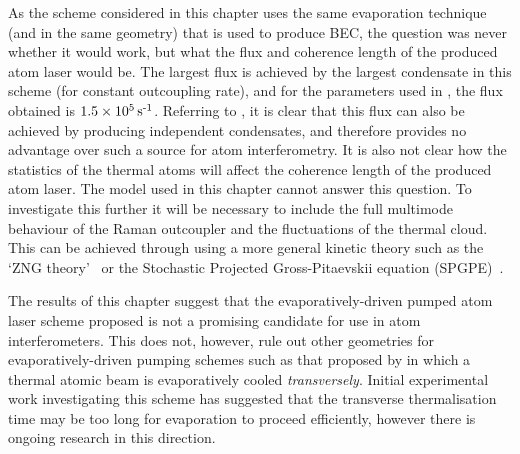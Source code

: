 As the scheme considered in this chapter uses the same evaporation technique (and in the same geometry) that is used to produce BEC, the question was never whether it would work, but what the flux and coherence length of the produced atom laser would be. The largest flux is achieved by the largest condensate in this scheme (for constant outcoupling rate), and for the parameters used in , the flux obtained is $1.5\times \unit[10^5]{s\textsuperscript{-1}}$.  Referring to , it is clear that this flux can also be achieved by producing independent condensates, and therefore provides no advantage over such a source for atom interferometry.  It is also not clear how the statistics of the thermal atoms will affect the coherence length of the produced atom laser.  The model used in this chapter cannot answer this question.  To investigate this further it will be necessary to include the full multimode behaviour of the Raman outcoupler and the fluctuations of the thermal cloud.  This can be achieved through using a more general kinetic theory such as the `ZNG theory'~\citep{Zaremba:1999,Proukakis:2008} or the Stochastic Projected Gross-Pitaevskii equation (SPGPE)~\citep{Blakie:2008a}.

The results of this chapter suggest that the evaporatively-driven pumped atom laser scheme proposed is not a promising candidate for use in atom interferometers.  This does not, however, rule out other geometries for evaporatively-driven pumping schemes such as that proposed by \citet{Mandonnet:2000lr} in which a thermal atomic beam is evaporatively cooled \emph{transversely}.  Initial experimental work investigating this scheme \citep{Cren:2002rt,Roos:2003vn,Roos:2003,Lahaye:2004,Vogels:2004,Lahaye:2005uq} has suggested that the transverse thermalisation time may be too long for evaporation to proceed efficiently, however there is ongoing research in this direction.





